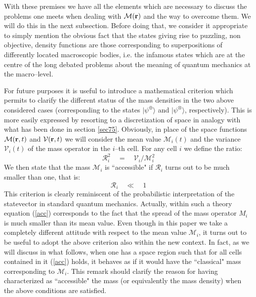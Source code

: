 \documentclass[12pt]{article}
\begin{document}
With these premises we have all the elements which are necessary
to discuss the problems one meets when dealing with ${\mathcal
M}({\bf r})$ and the way to overcome them. We will do this in the
next subsection. Before doing that, we consider it appropriate to
simply mention the obvious fact that the states giving rise to
puzzling, non objective, density functions are those corresponding
to superpositions of differently located macroscopic bodies, i.e.
the infamous states which are at the centre of the long debated
problems about the meaning of quantum mechanics at the
macro--level.

For future purposes it is useful to introduce a mathematical
criterion which permits  to clarify  the different status of
the mass densities in the two above considered cases
(corresponding to the states $|\psi^{\oplus}\rangle$  and
$|\psi^{\otimes}\rangle$, respectively). This is more easily
expressed by resorting to a discretization of space in analogy
with what has been done in section \ref{sec75}. Obviously, in
place of the space functions ${\mathcal M}({\bf r}, t)$ and
${\mathcal V}({\bf r}, t)$ we will consider the mean value
${\mathcal M}_{i}(t)$ and the variance ${\mathcal V}_{i}(t)$ of
the mass operator in the $i$--th cell. For any cell $i$ we define
the ratio:
\begin{equation}
{\mathcal R}_{i}^{2} \quad = \quad {\mathcal V}_{i} / {\mathcal
M}_{i}^{2}
\end{equation}
We then state that the mass ${\mathcal M}_{i}$ is ``accessible" if
${\mathcal R}_{i}$ turns out to be much smaller than one, that is:
\begin{equation} \label{acc}
{\mathcal R}_{i} \quad \ll \quad 1
\end{equation}
This criterion is clearly reminiscent of the probabilistic
interpretation of the statevector in standard quantum mechanics.
Actually, within such a theory equation (\ref{acc}) corresponds to
the fact that the spread of the mass operator $M_{i}$ is much
smaller than its mean value. Even though in this paper we take a
completely different attitude with respect to the mean value
${\mathcal M}_{i}$, it turns out to be useful to adopt the above
criterion also within the new context. In fact, as we will discuss
in what follows, when one has a space region such that for all
cells contained in it (\ref{acc}) holds, it behaves as if it would
have the ``classical" mass corresponding to ${\mathcal M}_{i}$. This
remark should clarify the reason for having characterized as
``accessible" the mass (or equivalently the mass density) when the above
conditions are satisfied.
\end{document}
